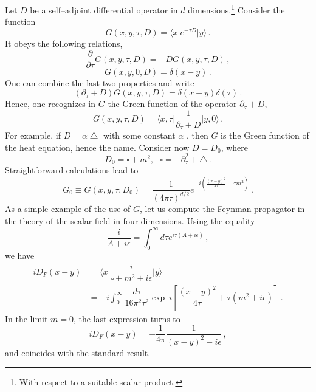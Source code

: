 \documentclass[12pt]{article}
\begin{document}
Let $D$ be a self--adjoint differential operator in $d$ dimensions.\footnote{With respect to a suitable scalar product.} Consider the function
\begin{equation}\label{DefOfKernel}
G(x,y,\tau,D)=\langle x\vert e^{-\tau D}\vert y\rangle \,.
\end{equation}
It obeys the following relations,
\begin{equation}
\dfrac{\partial}{\partial\tau}G(x,y,\tau,D)=-DG(x,y,\tau,D) \,,
\end{equation}
\begin{equation}
G(x,y,0,D)=\delta(x-y) \,.
\end{equation}
One can combine the last two properties and write
\begin{equation}
(\partial_\tau+D)G(x,y,\tau,D)=\delta(x-y)\delta(\tau) \,.
\end{equation}
Hence, one recognizes in $G$ the Green function of the operator $\partial_\tau+D$,
\begin{equation}
G(x,y,\tau,D)=\langle x,\tau\vert \dfrac{1}{\partial_\tau+D}\vert y,0\rangle \,.
\end{equation}
For example, if $D=\alpha\bigtriangleup$ with some constant $\alpha$ , then $G$ is the Green function of the heat equation, hence the name. Consider now $D=D_0$, where
\begin{equation}
D_0=\square+m^2, ~~~\square=-\partial_\tau^2+\bigtriangleup \,.
\end{equation}
Straightforward calculations lead to
\begin{equation}
G_0\equiv G(x,y,\tau,D_0)=\dfrac{1}{(4\pi\tau)^{d/2}}e^{-i\left(\frac{(x-y)^2}{4\tau}+\tau m^2\right)} \,.
\end{equation}
As a simple example of the use of $G$, let us compute the Feynman propagator in the theory of the scalar field in four dimensions. Using the equality
\begin{equation}
\dfrac{i}{A+i\epsilon}=\int_0^{\infty}d\tau e^{i\tau(A+i\epsilon)} \,,
\end{equation}
we have
\begin{equation}
\begin{split}
iD_F(x-y)&=\langle x\vert\dfrac{i}{\square+m^2+i\epsilon}\vert y\rangle\\
&=-i\int_0^{\infty}\dfrac{d\tau}{16\pi^2\tau^2}\exp~i\left[\dfrac{(x-y)^2}{4\tau}+\tau(m^2+i\epsilon)\right] \,.
\end{split}
\end{equation}
In the limit $m=0$, the last expression turns to
\begin{equation}
iD_F(x-y)=-\dfrac{1}{4\pi}\dfrac{1}{(x-y)^2-i\epsilon}\,,
\end{equation}
and coincides with the standard result.
\end{document}
